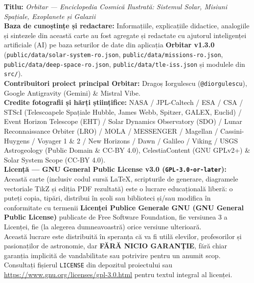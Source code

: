 \documentclass[11pt,a4paper,twoside,openany]{book}
\begin{document}
\thispagestyle{empty}
\vspace*{0.4cm}
\begin{tcolorbox}[orbitardata, title={\textbf{Caseta Tehnică a Cărții și Licența Liberă GNU GPLv3}}]
\textbf{Titlu:} \emph{Orbitar — Enciclopedia Cosmică Ilustrată: Sistemul Solar, Misiuni Spațiale, Exoplanete și Galaxii}\\[4pt]
\textbf{Baza de cunoștințe și redactare:} Informațiile, explicațiile didactice, analogiile și sintezele din această carte au fost agregate și redactate cu ajutorul inteligenței artificiale (AI) pe baza seturilor de date din aplicația \textbf{Orbitar v1.3.0} (\texttt{public/data/solar-system-ro.json}, \texttt{public/data/missions-ro.json}, \texttt{public/data/deep-space-ro.json}, \texttt{public/data/tle-iss.json} și modulele din \texttt{src/}).\\[4pt]
\textbf{Contribuitori proiect principal Orbitar:} Dragoș Iorgulescu (\texttt{@diorgulescu}), Google Antigravity (Gemini) \& Mistral Vibe.\\[4pt]
\textbf{Credite fotografii și hărți științifice:} NASA / JPL-Caltech / ESA / CSA / STScI (Telescoapele Spațiale Hubble, James Webb, Spitzer, GALEX, Euclid) / Event Horizon Telescope (EHT) / Solar Dynamics Observatory (SDO) / Lunar Reconnaissance Orbiter (LRO) / MOLA / MESSENGER / Magellan / Cassini-Huygens / Voyager 1 \& 2 / New Horizons / Dawn / Galileo / Viking / USGS Astrogeology (Public Domain \& CC-BY 4.0), CelestiaContent (GNU GPLv2+) \& Solar System Scope (CC-BY 4.0).\\[6pt]
\textbf{Licență — GNU General Public License v3.0 (\texttt{GPL-3.0-or-later}):}\\
Această carte (inclusiv codul sursă \LaTeX{}, scripturile de generare, diagramele vectoriale TikZ și ediția PDF rezultată) este o lucrare educațională liberă: o puteți copia, tipări, distribui în școli sau biblioteci și/sau modifica în conformitate cu termenii \textbf{Licenței Publice Generale GNU (GNU General Public License)} publicate de Free Software Foundation, fie versiunea 3 a Licenței, fie (la alegerea dumneavoastră) orice versiune ulterioară.\\[4pt]
Această lucrare este distribuită în speranța că va fi utilă elevilor, profesorilor și pasionaților de astronomie, dar \textbf{FĂRĂ NICIO GARANȚIE}, fără chiar garanția implicită de vandabilitate sau potrivire pentru un anumit scop. Consultați fișierul \texttt{LICENSE} din depozitul proiectului sau \url{https://www.gnu.org/licenses/gpl-3.0.html} pentru textul integral al licenței.
\end{tcolorbox}
\end{document}
